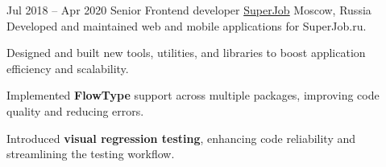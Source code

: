 \cventry
{Jul 2018 – Apr 2020}
{Senior Frontend developer}
{\href{https://superjob.ru}{SuperJob}}
{Moscow, Russia}
{}
{Developed and maintained web and mobile applications for SuperJob.ru.}

\cvlistitem
{Designed and built new tools, utilities, and libraries to boost application efficiency and scalability.}

\cvlistitem
{Implemented \textbf{FlowType} support across multiple packages, improving code quality and reducing errors.}

\cvlistitem
{Introduced \textbf{visual regression testing}, enhancing code reliability and streamlining the testing workflow.}
